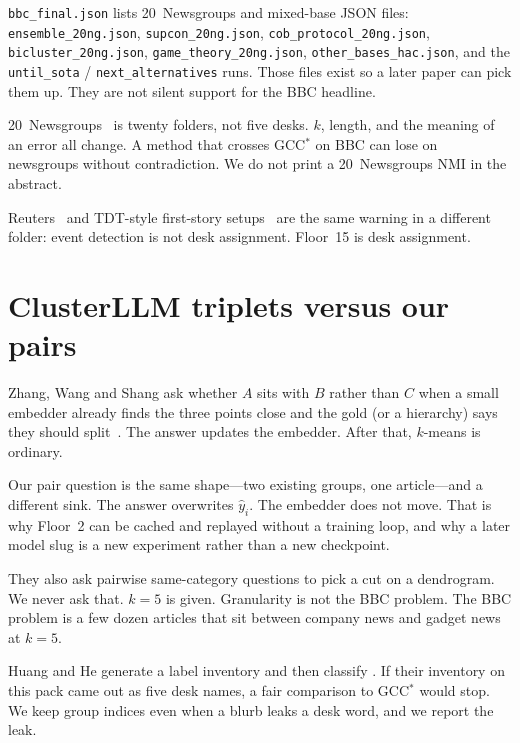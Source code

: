 \documentclass[11pt,a4paper]{article}
\begin{document}
\texttt{bbc\_final.json} lists 20~Newsgroups and mixed-base
JSON files: \texttt{ensemble\_20ng.json},
\texttt{supcon\_20ng.json}, \texttt{cob\_protocol\_20ng.json},
\texttt{bicluster\_20ng.json},
\texttt{game\_theory\_20ng.json},
\texttt{other\_bases\_hac.json}, and the
\texttt{until\_sota} / \texttt{next\_alternatives} runs.
Those files exist so a later paper can pick them up. They
are not silent support for the BBC headline.

20~Newsgroups~\cite{lang1995newsweeder} is twenty folders,
not five desks. $k$, length, and the meaning of an error
all change. A method that crosses GCC$^*$ on BBC can lose
on newsgroups without contradiction. We do not print a
20~Newsgroups NMI in the abstract.

Reuters~\cite{lewis1997reuters} and TDT-style first-story
setups~\cite{allan1998tdt,petrovic2010fsd} are the same
warning in a different folder: event detection is not desk
assignment. Floor~15 is desk assignment.

\section{ClusterLLM triplets versus our pairs}

Zhang, Wang and Shang ask whether $A$ sits with $B$ rather
than $C$ when a small embedder already finds the three
points close and the gold (or a hierarchy) says they should
split~\cite{zhang2023clusterllm}. The answer updates the
embedder. After that, $k$-means is ordinary.

Our pair question is the same shape---two existing groups,
one article---and a different sink. The answer overwrites
$\hat{y}_i$. The embedder does not move. That is why Floor~2
can be cached and replayed without a training loop, and why
a later model slug is a new experiment rather than a new
checkpoint.

They also ask pairwise same-category questions to pick a
cut on a dendrogram. We never ask that. $k=5$ is given.
Granularity is not the BBC problem. The BBC problem is a
few dozen articles that sit between company news and gadget
news at $k=5$.

Huang and He generate a label inventory and then classify
\cite{huang2024tcllc}. If their inventory on this pack came
out as five desk names, a fair comparison to GCC$^*$ would
stop. We keep group indices even when a blurb leaks a desk
word, and we report the leak.
\end{document}
